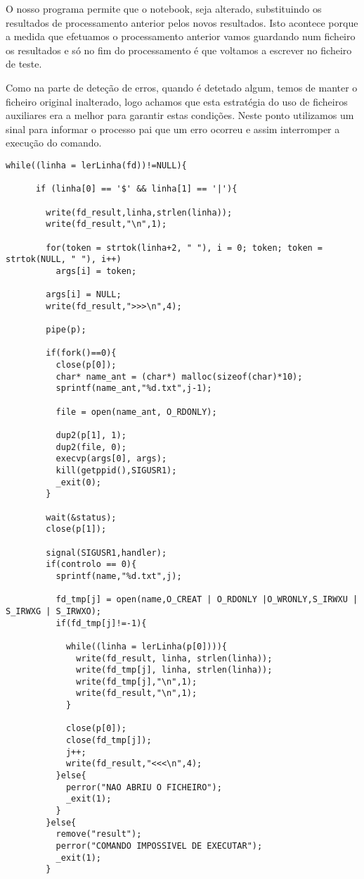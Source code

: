 \documentclass{report}
\begin{document}
O nosso programa permite que o notebook, seja alterado, substituindo os resultados de processamento anterior pelos novos resultados. Isto acontece porque a medida que efetuamos o processamento anterior vamos guardando num ficheiro os resultados e só no fim do processamento é que voltamos a escrever no ficheiro de teste.

Como na parte de deteção de erros, quando é detetado algum, temos de manter o ficheiro original inalterado, logo achamos que esta estratégia do uso de ficheiros auxiliares era a melhor para garantir estas condições. Neste ponto utilizamos um sinal para informar o processo pai que um erro ocorreu e assim interromper a execução do comando.

\begin{verbatim}
while((linha = lerLinha(fd))!=NULL){
      
      if (linha[0] == '$' && linha[1] == '|'){  
        
        write(fd_result,linha,strlen(linha));
        write(fd_result,"\n",1);

        for(token = strtok(linha+2, " "), i = 0; token; token = strtok(NULL, " "), i++)
          args[i] = token;
          
        args[i] = NULL;
        write(fd_result,">>>\n",4);

        pipe(p);
        
        if(fork()==0){
          close(p[0]);
          char* name_ant = (char*) malloc(sizeof(char)*10);
          sprintf(name_ant,"%d.txt",j-1);

          file = open(name_ant, O_RDONLY);

          dup2(p[1], 1);
          dup2(file, 0);
          execvp(args[0], args);
          kill(getppid(),SIGUSR1);
          _exit(0);
        }
      
        wait(&status);
        close(p[1]);

        signal(SIGUSR1,handler);
        if(controlo == 0){
          sprintf(name,"%d.txt",j);
        
          fd_tmp[j] = open(name,O_CREAT | O_RDONLY |O_WRONLY,S_IRWXU | S_IRWXG | S_IRWXO);
          if(fd_tmp[j]!=-1){
            
            while((linha = lerLinha(p[0]))){
              write(fd_result, linha, strlen(linha));
              write(fd_tmp[j], linha, strlen(linha));
              write(fd_tmp[j],"\n",1);
              write(fd_result,"\n",1);
            } 

            close(p[0]);
            close(fd_tmp[j]);
            j++;
            write(fd_result,"<<<\n",4);
          }else{
            perror("NAO ABRIU O FICHEIRO");
            _exit(1);
          }
        }else{
          remove("result");
          perror("COMANDO IMPOSSIVEL DE EXECUTAR");
          _exit(1);
        } 
\end{verbatim}
\end{document}
